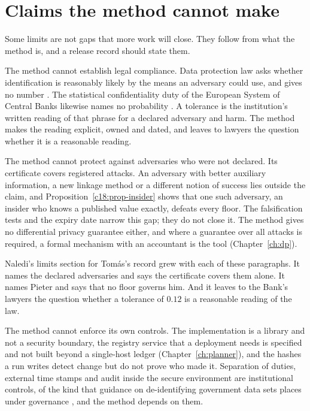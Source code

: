\section{Claims the method cannot make}

Some limits are not gaps that more work will close. They follow from what the method
is, and a release record should state them.

The method cannot establish legal compliance. Data protection law asks whether
identification is reasonably likely by the means an adversary could use, and gives no
number \citep{gdpr2016}. The statistical confidentiality duty of the European System of
Central Banks likewise names no probability \citep{ec2533}. A tolerance is the
institution's written reading of that phrase for a declared adversary and harm. The
method makes the reading explicit, owned and dated, and leaves to lawyers the question
whether it is a reasonable reading.

The method cannot protect against adversaries who were not declared. Its certificate
covers registered attacks. An adversary with better auxiliary information, a new
linkage method or a different notion of success lies outside the claim, and
Proposition~\ref{c18:prop-insider} shows that one such adversary, an insider who knows a
published value exactly, defeats every floor. The falsification tests and the expiry
date narrow this gap; they do not close it. The method gives no differential privacy
guarantee either, and where a guarantee over all attacks is required, a formal
mechanism with an accountant is the tool (Chapter~\ref{ch:dp}).

Naledi's limits section for Tom\'as's record grew with each of these paragraphs. It
names the declared adversaries and says the certificate covers them alone. It names
Pieter and says that no floor governs him. And it leaves to the Bank's lawyers the
question whether a tolerance of $0.12$ is a reasonable reading of the law.

The method cannot enforce its own controls. The implementation is a library and not a
security boundary, the registry service that a deployment needs is specified and not
built beyond a single-host ledger (Chapter~\ref{ch:planner}), and the hashes a run writes detect change but do not prove who made it.
Separation of duties, external time stamps and audit inside the secure environment are
institutional controls, of the kind that guidance on de-identifying government data sets places under governance \citep{garfinkel2023}, and the method depends on them.

